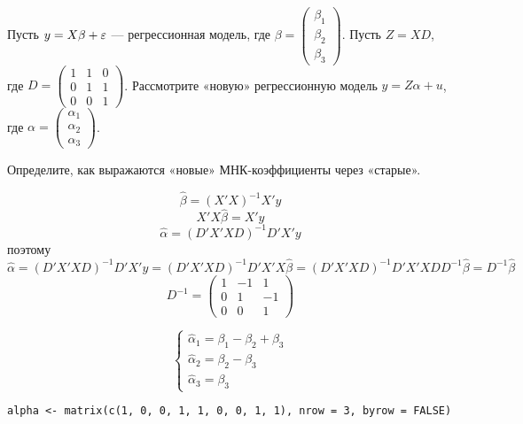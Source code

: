 \begin{problem}
Пусть $y = X\beta + \varepsilon$ — регрессионная модель, где $\beta = \begin{pmatrix} \beta_1 \\ \beta_2 \\ \beta_3 \end{pmatrix}$. Пусть $Z = XD$, где $D = \begin{pmatrix} 1 & 1 & 0 \\ 0 & 1 & 1 \\ 0 & 0 & 1 \end{pmatrix}$. Рассмотрите «новую» регрессионную модель $y = Z\alpha + u$, где $\alpha = \begin{pmatrix} \alpha_1 \\ \alpha_2 \\ \alpha_3 \end{pmatrix}$.

Определите, как выражаются «новые» МНК-коэффициенты через «старые».


\begin{sol}
\[\hat\beta=(X'X)^{-1}X'y\]
\[X'X\hat\beta=X'y\]
\[\hat\alpha=(D'X'XD)^{-1}D'X'y\]
поэтому
\[\hat\alpha=(D'X'XD)^{-1}D'X'y=(D'X'XD)^{-1}D'X'X\hat\beta=(D'X'XD)^{-1}D'X'XDD^{-1}\hat\beta=D^{-1}\hat\beta\]
\[D^{-1}=\left(\begin{array}{ccc}
1 & -1 & 1\\
0 & 1 & -1\\
0 & 0 & 1
\end{array}\right)\]

\[\begin{cases}
\hat\alpha_1=\beta_1-\beta_2+\beta_3\\
\hat\alpha_2=\beta_2-\beta_3\\
\hat\alpha_3=\beta_3
\end{cases}\]


\begin{verbatim}
alpha <- matrix(c(1, 0, 0, 1, 1, 0, 0, 1, 1), nrow = 3, byrow = FALSE)
\end{verbatim}

\end{sol}
\end{problem}



